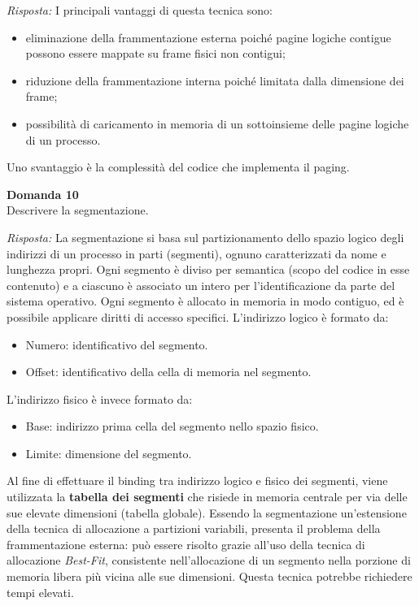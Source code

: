 \documentclass{article}
\newenvironment{problem}[2][Domanda]
    { \begin{mdframed}[backgroundcolor=gray!20] \textbf{#1 #2} \\}
    {  \end{mdframed}}
\newenvironment{solution}
    {\textit{Risposta:}}
    {}
\begin{document}
\begin{solution}
I principali vantaggi di questa tecnica sono:
\begin{itemize}
    \item eliminazione della frammentazione esterna poiché pagine logiche contigue possono essere mappate su frame fisici non contigui;
    \item riduzione della frammentazione interna poiché limitata dalla dimensione dei frame;
    \item possibilità di caricamento in memoria di un sottoinsieme delle pagine logiche di un processo.
\end{itemize}
Uno svantaggio è la complessità del codice che implementa il paging.
\end{solution}
\begin{problem}{10}
Descrivere la segmentazione.
\end{problem}
\begin{solution}
La segmentazione si basa sul partizionamento dello spazio logico degli indirizzi di un processo in parti (segmenti), ognuno caratterizzati da nome e lunghezza propri.
\newline
Ogni segmento è diviso per semantica (scopo del codice in esse contenuto) e a ciascuno è associato un intero per l’identificazione da parte del sistema operativo.
\newline
Ogni segmento è allocato in memoria in modo contiguo, ed è possibile applicare diritti di accesso specifici.
\newline
\newline
L’indirizzo logico è formato da:
\begin{itemize}
    \item Numero: identificativo del segmento.
    \item Offset: identificativo della cella di memoria nel segmento.
\end{itemize}
L’indirizzo fisico è invece formato da:
\begin{itemize}
    \item Base: indirizzo prima cella del segmento nello spazio fisico.
    \item Limite: dimensione del segmento.
\end{itemize}
Al fine di effettuare il binding tra indirizzo logico e fisico dei segmenti, viene utilizzata la \textbf{tabella dei segmenti} che risiede in memoria centrale per via delle sue elevate dimensioni (tabella globale).
\newline
Essendo la segmentazione un’estensione della tecnica di allocazione a partizioni variabili, presenta il problema della frammentazione esterna: può essere risolto grazie all’uso della tecnica di allocazione \emph{Best-Fit}, consistente nell’allocazione di un segmento nella porzione di memoria libera più vicina alle sue dimensioni.
\newline
Questa tecnica potrebbe richiedere tempi elevati.
\end{solution}
\end{document}
